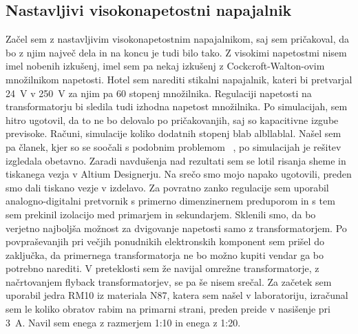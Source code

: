 \documentclass[a4paper,twoside,openright,12pt,slovene]{book}
\begin{document}
	\subsection{Nastavljivi visokonapetostni napajalnik}
	Začel sem z nastavljivim visokonapetostnim napajalnikom, saj sem pričakoval, da bo z njim največ dela in na koncu je tudi bilo tako. Z visokimi napetostmi nisem imel nobenih izkušenj, imel sem pa nekaj izkušenj z Cockcroft-Walton-ovim množilnikom napetosti. Hotel sem narediti stikalni napajalnik, kateri bi pretvarjal \SI{24}{\volt} v \SI{250}{\volt} za njim pa 60 stopenj množilnika. Regulaciji napetosti na transformatorju bi sledila tudi izhodna napetost množilnika. Po simulacijah, sem hitro ugotovil, da to ne bo delovalo po pričakovanjih, saj so kapacitivne izgube previsoke. Računi, simulacije koliko dodatnih stopenj blab albllablal. Našel sem pa članek, kjer so se soočali s podobnim problemom ~\cite{Using Parallel High Voltage Multipliers for 100kV Downhole Neutron Generator Power Supplies}, po simulacijah je rešitev izgledala obetavno. Zaradi navdušenja nad rezultati sem se lotil risanja sheme in tiskanega vezja v Altium Designerju. Na srečo smo mojo napako ugotovili, preden smo dali tiskano vezje v izdelavo. Za povratno zanko regulacije sem uporabil analogno-digitalni pretvornik s primerno dimenzinernem preduporom in s tem sem prekinil izolacijo med primarjem in sekundarjem. Sklenili smo, da bo verjetno najboljša možnost za dvigovanje napetosti samo z transformatorjem. Po povpraševanjih pri večjih ponudnikih elektronskih komponent sem prišel do zaključka, da primernega transformatorja ne bo možno kupiti vendar ga bo potrebno narediti. V preteklosti sem že navijal omrežne transformatorje, z načrtovanjem flyback transformatorjev, se pa še nisem srečal. Za začetek sem uporabil jedra RM10 iz materiala N87, katera sem našel v laboratoriju, izračunal sem le koliko obratov rabim na primarni strani, preden preide v nasišenje pri \SI{3}{\ampere}. Navil sem enega z razmerjem 1:10 in enega z 1:20.
\end{document}
